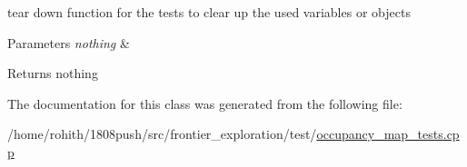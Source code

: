 tear down function for the tests to clear up the used variables or objects 


\begin{DoxyParams}{Parameters}
{\em nothing} & \\
\hline
\end{DoxyParams}
\begin{DoxyReturn}{Returns}
nothing 
\end{DoxyReturn}


The documentation for this class was generated from the following file\+:\begin{DoxyCompactItemize}
\item 
/home/rohith/1808push/src/frontier\+\_\+exploration/test/\hyperlink{occupancy__map__tests_8cpp}{occupancy\+\_\+map\+\_\+tests.\+cpp}\end{DoxyCompactItemize}
